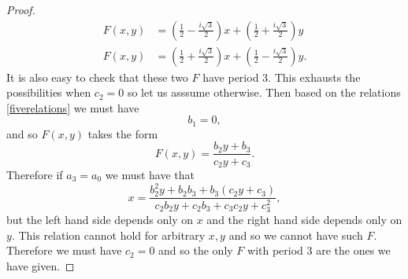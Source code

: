 \documentclass[12pt]{article}
\begin{document}
\begin{proof}
\begin{align*}
F(x,y) &= \left( \frac{1}{2} -\frac{i\sqrt{3}}{2} \right) x + \left( \frac{1}{2} +\frac{i\sqrt{3}}{2} \right) y \\
F(x,y) &= \left( \frac{1}{2} +\frac{i\sqrt{3}}{2} \right) x + \left( \frac{1}{2} -\frac{i\sqrt{3}}{2} \right) y.
\end{align*}
It is also easy to check that these two $F$ have period 3. This exhausts the possibilities when $c_2=0$ so let us asssume otherwise. Then based on the relations \ref{fiverelations} we must have 
\begin{equation*}
b_1 = 0,
\end{equation*}
and so $F(x,y)$ takes the form 
\begin{equation*}
F(x,y) = \frac{b_2 y + b_3}{c_2 y + c_3}.
\end{equation*}
Therefore if $a_3 = a_0$ we must have that 
\begin{equation*}
x = \frac{ b_2^2 y + b_2b_3 +b_3(c_2 y + c_3)}{c_2 b_2 y + c_2 b_3 + c_3 c_2 y + c_3^2},
\end{equation*}
but the left hand side depends only on $x$ and the right hand side depends only on $y$. This relation cannot hold for arbitrary $x,y$ and so we cannot have such $F$. Therefore we must have $c_2=0$ and so the only $F$ with period 3 are the ones we have given. 
\end{proof}
\end{document}
